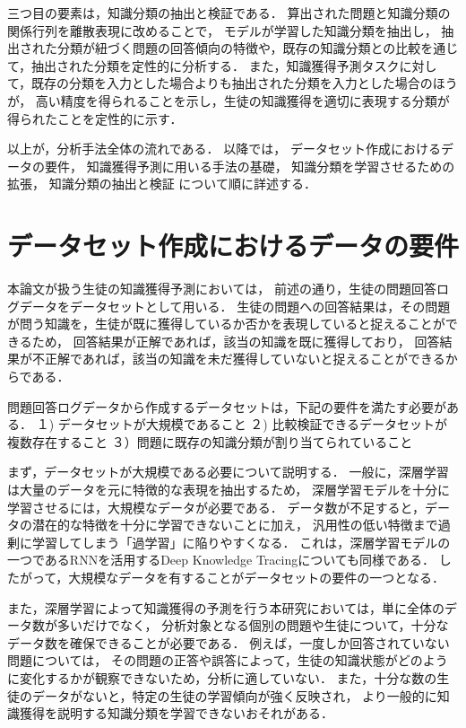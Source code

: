 三つ目の要素は，知識分類の抽出と検証である．
算出された問題と知識分類の関係行列を離散表現に改めることで，
モデルが学習した知識分類を抽出し，
抽出された分類が紐づく問題の回答傾向の特徴や，既存の知識分類との比較を通じて，抽出された分類を定性的に分析する．
また，知識獲得予測タスクに対して，既存の分類を入力とした場合よりも抽出された分類を入力とした場合のほうが，
高い精度を得られることを示し，生徒の知識獲得を適切に表現する分類が得られたことを定性的に示す．


以上が，分析手法全体の流れである．
以降では，
データセット作成におけるデータの要件，
知識獲得予測に用いる手法の基礎，
知識分類を学習させるための拡張，
知識分類の抽出と検証
について順に詳述する．


\section{データセット作成におけるデータの要件}
本論文が扱う生徒の知識獲得予測においては，
前述の通り，生徒の問題回答ログデータをデータセットとして用いる．
生徒の問題への回答結果は，その問題が問う知識を，生徒が既に獲得しているか否かを表現していると捉えることができるため，
回答結果が正解であれば，該当の知識を既に獲得しており，
回答結果が不正解であれば，該当の知識を未だ獲得していないと捉えることができるからである．

問題回答ログデータから作成するデータセットは，下記の要件を満たす必要がある．
１) データセットが大規模であること
２) 比較検証できるデータセットが複数存在すること
３）問題に既存の知識分類が割り当てられていること

まず，データセットが大規模である必要について説明する．
一般に，深層学習は大量のデータを元に特徴的な表現を抽出するため，
深層学習モデルを十分に学習させるには，大規模なデータが必要である．
データ数が不足すると，データの潜在的な特徴を十分に学習できないことに加え，
汎用性の低い特徴まで過剰に学習してしまう「過学習」に陥りやすくなる．
これは，深層学習モデルの一つであるRNNを活用するDeep Knowledge Tracingについても同様である\cite{piech2015deep}．
したがって，大規模なデータを有することがデータセットの要件の一つとなる．

また，深層学習によって知識獲得の予測を行う本研究においては，単に全体のデータ数が多いだけでなく，
分析対象となる個別の問題や生徒について，十分なデータ数を確保できることが必要である．
例えば，一度しか回答されていない問題については，
その問題の正答や誤答によって，生徒の知識状態がどのように変化するかが観察できないため，分析に適していない．
また，十分な数の生徒のデータがないと，特定の生徒の学習傾向が強く反映され，
より一般的に知識獲得を説明する知識分類を学習できないおそれがある．


